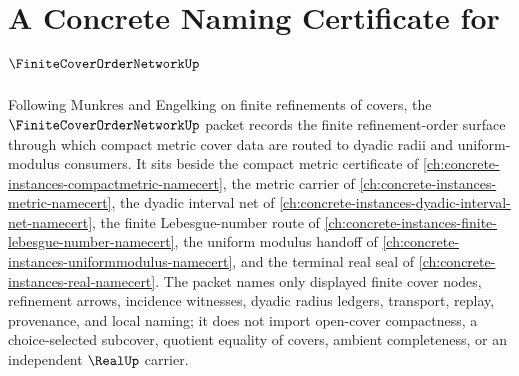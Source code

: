 \chapter{A Concrete Naming Certificate for $\FiniteCoverOrderNetworkUp$}
\label{ch:concrete-instances-finite-cover-order-network-namecert}

Following Munkres and Engelking on finite refinements of covers, the $\FiniteCoverOrderNetworkUp$ packet records the finite refinement-order surface through which compact metric cover data are routed to dyadic radii and uniform-modulus consumers. It sits beside the compact metric certificate of \autoref{ch:concrete-instances-compactmetric-namecert}, the metric carrier of \autoref{ch:concrete-instances-metric-namecert}, the dyadic interval net of \autoref{ch:concrete-instances-dyadic-interval-net-namecert}, the finite Lebesgue-number route of \autoref{ch:concrete-instances-finite-lebesgue-number-namecert}, the uniform modulus handoff of \autoref{ch:concrete-instances-uniformmodulus-namecert}, and the terminal real seal of \autoref{ch:concrete-instances-real-namecert}. The packet names only displayed finite cover nodes, refinement arrows, incidence witnesses, dyadic radius ledgers, transport, replay, provenance, and local naming; it does not import open-cover compactness, a choice-selected subcover, quotient equality of covers, ambient completeness, or an independent $\RealUp$ carrier.


